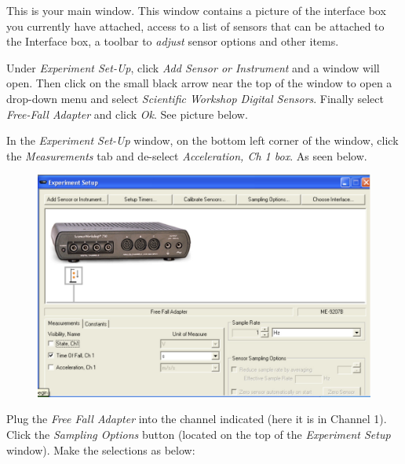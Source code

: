 This is your main window. This window contains a picture of the interface box you currently have attached, 
access to a list of sensors that can be attached to the Interface box, a toolbar to \emph{adjust} sensor options and other items.

Under \emph{Experiment Set-Up}, click \emph{Add Sensor or Instrument} and a window will open. 
Then click on the small black arrow near the top of the window to open a drop-down 
menu and select \emph{Scientific Workshop Digital Sensors}. Finally select \emph{Free-Fall Adapter} and click \emph{Ok}. See picture below.

In the \emph{Experiment Set-Up} window, on the bottom left corner of the window, 
click the \emph{Measurements} tab and de-select \emph{Acceleration, Ch 1 box}. As seen below.

\begin{figure}[t!]
  \centerline{\includegraphics[scale=0.45]{resources/photo4.jpg}}
\end{figure}

  \newpage Plug the \emph{Free Fall Adapter} into the channel indicated (here it is in Channel 1).
Click the \emph{Sampling Options} button (located on the top of the \emph{Experiment Setup} window). Make the selections as below:


